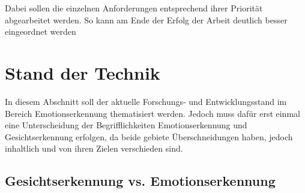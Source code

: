 \documentclass[12pt, a4paper]{report}
\begin{document}
Dabei sollen die einzelnen Anforderungen entsprechend ihrer Priorität abgearbeitet werden. So kann am Ende der Erfolg der Arbeit deutlich besser eingeordnet werden

\let\cleardoublepage\relax

\chapter{Stand der Technik}
In diesem Abschnitt soll der aktuelle Forschungs- und Entwicklungsstand im Bereich Emotionserkennung thematisiert werden. Jedoch muss dafür erst einmal eine Unterscheidung der Begrifflichkeiten
Emotionserkennung und Gesichtserkennung erfolgen, da beide gebiete Überschneidungen haben, jedoch inhaltlich und von ihren Zielen verschieden sind.

\section{Gesichtserkennung vs. Emotionserkennung}
\end{document}

